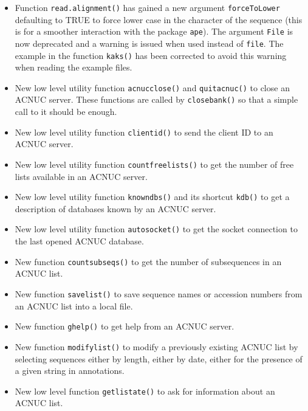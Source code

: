\documentclass{article}
\begin{document}
\begin{itemize}
\item Function \texttt{read.alignment()} has gained a new argument
  \texttt{forceToLower} defaulting to TRUE to force lower case in
  the character of the sequence (this is for a smoother interaction
  with the package \texttt{ape}). The argument \texttt{File} is now
  deprecated and a warning is issued when used instead of \texttt{file}. 
  The example in the function \texttt{kaks()} has been corrected
  to avoid this warning when reading the example files.

\item New low level utility function \texttt{acnucclose()} and
  \texttt{quitacnuc()} to close an ACNUC server. These functions
  are called by \texttt{closebank()} so that a simple call to
  it should be enough.

\item New low level utility function \texttt{clientid()} to
  send the client ID to an ACNUC server.

\item New low level utility function \texttt{countfreelists()} to
  get the number of free lists available in an ACNUC server.

\item New low level utility function \texttt{knowndbs()} and its
  shortcut \texttt{kdb()} to get a description of databases 
  known by an ACNUC server.

\item New low level utility function \texttt{autosocket()} to get the
  socket connection to the last opened ACNUC database.

\item New function \texttt{countsubseqs()} to get the number of 
  subsequences in an ACNUC list.

\item New function \texttt{savelist()} to save sequence names or 
  accession numbers from an ACNUC list into a local file.

\item New function \texttt{ghelp()} to get help from an ACNUC server.

\item New function \texttt{modifylist()} to modify a previously existing 
  ACNUC list by selecting sequences either by length, either by date, 
  either for the presence of a given string in annotations.

\item New low level function \texttt{getlistate()} to ask for 
  information about an ACNUC list.


\end{itemize}
\end{document}

